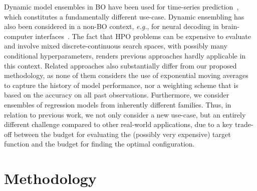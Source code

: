 Dynamic model ensembles in BO have been used for time-series prediction~\citep{Liu23}, which constitutes a fundamentally different use-case. 
Dynamic ensembling has also been considered in a non-BO context, \emph{e.g.}, for neural decoding in brain-computer interfaces~\citep{QiEtAl19}.
The fact that HPO problems can be expensive to evaluate and involve mixed discrete-continuous search spaces, with possibly many conditional hyperparameters, renders previous approaches hardly applicable in this context.
Related approaches also substantially differ from our proposed methodology, as none of them considers the use of exponential moving averages to capture the history of model performance, nor a weighting scheme that is based on the accuracy on all past observations.
Furthermore, we consider ensembles of regression models from inherently different families.
Thus, in relation to previous work, we not only consider a new use-case, but an entirely different challenge compared to other real-world applications, due to a key trade-off between the budget for evaluating the (possibly very expensive) target function and the budget for finding the optimal %
configuration.



\section{Methodology}
\label{sec:ch05:method}

